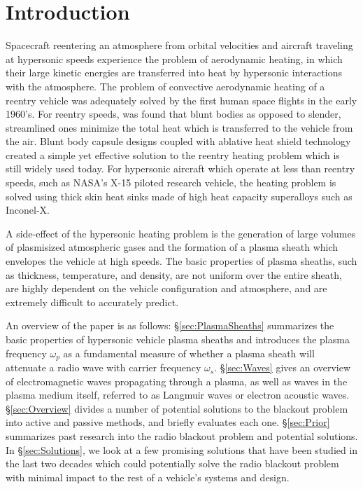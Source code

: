 \documentclass[twocolumn]{article}
\begin{document}
\section{Introduction}
	Spacecraft reentering an atmosphere from orbital velocities and aircraft traveling at hypersonic speeds experience the problem of aerodynamic heating, in which their large kinetic energies are transferred into heat by hypersonic interactions with the atmosphere.
	The problem of convective aerodynamic heating of a reentry vehicle was adequately solved by the first human space flights in the early 1960's.
	For reentry speeds, was found that blunt bodies as opposed to slender, streamlined ones minimize the total heat which is transferred to the vehicle from the air.\cite{allen_study_1958}
	Blunt body capsule designs coupled with ablative heat shield technology created a simple yet effective solution to the reentry heating problem which is still widely used today.
	For hypersonic aircraft which operate at less than reentry speeds, such as NASA's X-15 piloted research vehicle, the heating problem is solved using thick skin heat sinks made of high heat capacity superalloys such as Inconel-X.\cite{stillwell_x-15_1965}
	
	A side-effect of the hypersonic heating problem is the generation of large volumes of plasmisized atmospheric gases and the formation of a plasma sheath which envelopes the vehicle at high speeds.
	The basic properties of plasma sheaths, such as thickness, temperature, and density, are not uniform over the entire sheath, are highly dependent on the vehicle configuration and atmosphere, and are extremely difficult to accurately predict.
	
	An overview of the paper is as follows: \S\ref{sec:PlasmaSheaths} summarizes the basic properties of hypersonic vehicle plasma sheaths and introduces the plasma frequency $\omega_p$ as a fundamental measure of whether a plasma sheath will attenuate a radio wave with carrier frequency $\omega_s$.
	\S\ref{sec:Waves} gives an overview of electromagnetic waves propagating through a plasma, as well as waves in the plasma medium itself, referred to as Langmuir waves or electron acoustic waves.
	\S\ref{sec:Overview} divides a number of potential solutions to the blackout problem into active and passive methods, and briefly evaluates each one.
	\S\ref{sec:Prior} summarizes past research into the radio blackout problem and potential solutions.
	In \S\ref{sec:Solutions}, we look at a few promising solutions that have been studied in the last two decades which could potentially solve the radio blackout problem with minimal impact to the rest of a vehicle's systems and design.
	
\end{document}
